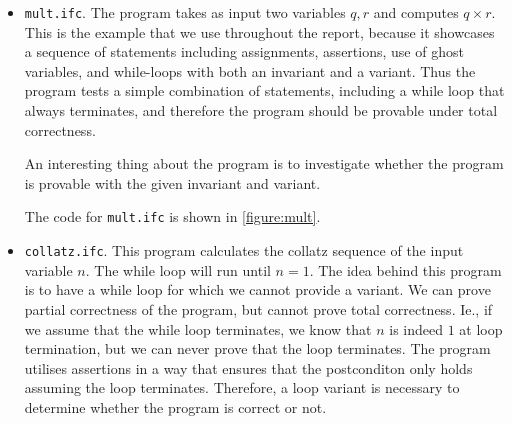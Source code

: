 \begin{itemize}
  \item {\texttt{mult.ifc}.} 
	The program takes as input two variables $q,r$ and computes $q \times r$.
  This is the example that we use throughout the report, because it showcases a sequence of statements including assignments, assertions, use of ghost variables, and while-loops with both an invariant and a variant.
  Thus the program tests a simple combination of statements, including a while loop that always terminates, and therefore the program should be provable under total correctness.

  An interesting thing about the program is to investigate whether the program is provable with the given invariant and variant.


  The code for \texttt{mult.ifc} is shown in \cref{figure:mult}.

  \item{\texttt{collatz.ifc}.}
  This program calculates the collatz sequence of the input variable $n$. The while loop will run until $n = 1$.
  The idea behind this program is to have a while loop for which we cannot provide a variant. 
	We can prove partial correctness of the program, but cannot prove total correctness.
	Ie., if we assume that the while loop terminates, we know that $n$ is indeed $1$ at loop termination, but we can never prove that the loop terminates.
  The program utilises assertions in a way that ensures that the postconditon only holds assuming the loop terminates.
  Therefore, a loop variant is necessary to determine whether the program is correct or not.


\end{itemize}
